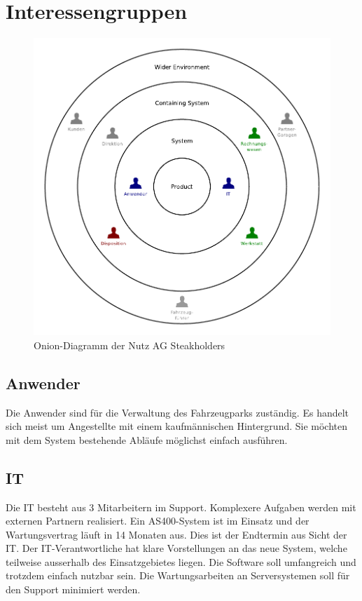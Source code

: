 \section{Interessengruppen}

\begin{center}
  \begin{figure}[ht]
    \includegraphics{graphics/onion.pdf}
    \caption{Onion-Diagramm der Nutz AG Steakholders}
    \label{fig:awesome_image}
  \end{figure}
\end{center}

\newpage
\subsection{Anwender}
Die Anwender sind für die Verwaltung des Fahrzeugparks zuständig. Es handelt sich meist um Angestellte mit einem kaufmännischen Hintergrund. Sie möchten mit dem System bestehende Abläufe möglichst einfach ausführen. 


\subsection{IT}
Die IT besteht aus 3 Mitarbeitern im Support. Komplexere Aufgaben werden mit externen Partnern realisiert. Ein AS400-System ist im Einsatz und der Wartungsvertrag läuft in 14 Monaten aus. Dies ist der Endtermin aus Sicht der IT. Der IT-Verantwortliche hat klare Vorstellungen an das neue System, welche teilweise ausserhalb des Einsatzgebietes liegen. Die Software soll umfangreich und trotzdem einfach nutzbar sein. Die Wartungsarbeiten an Serversystemen soll für den Support minimiert werden.

